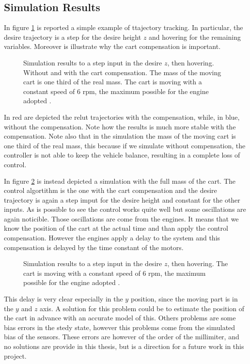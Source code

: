 \subsection{Simulation Results}

In figure \ref{fig:simulation1} is reported a simple example of ttajectory tracking. In particular, the desire trajectory is a step for the desire height $z$ and hovering for the remaining variables. Moreover is illustrate why the cart compensation is important. 

\begin{figure}[h]
	\centering
 	
 	\caption{Simulation results to a step input in the desire $z$, then hovering. Without and with the cart compensation. The mass of the moving cart is one third of the real mass. The cart is moving with a constant speed of $6$ rpm, the maximum possible for the engine adopted \cite{Carlos}.}
 	\label{fig:simulation1}		
\end{figure}

\noindent In red are depicted the relut trajectories with the compensation, while, in blue, without the compensation. Note how the results is much more stable with the compensation. Note also that in the simulation the mass of the moving cart is one third of the real mass, this because if we simulate without compensation, the controller is not able to keep the vehicle balance, resulting in a complete loss of control. 

\noindent In figure \ref{fig:simulation2} is instead depicted a simulation with the full mass of the cart. The control algortithm is the one with the cart compensation and the desire trajectory is again a step imput for the desire height and constant for the other inputs. As is possible to see the control works quite well but some oscillations are again noticible. Those oscillations are come from the engines. It means that we know the position of the cart at the actual time and than apply the control compensation. However the engines apply a delay to the system and this compensation is delayed by the time constant of the motors. 

\begin{figure}[h]
	\centering
 	
 	\caption{Simulation results to a step input in the desire $z$, then hovering. The cart is moving with a constant speed of $6$ rpm, the maximum possible for the engine adopted \cite{Carlos}.}
 	\label{fig:simulation2}		
\end{figure}

\noindent This delay is very clear especially in the $y$ position, since the moving part is in the $y$ and $z$ axis. A solution for this problem could be to estimate the position of the cart in advance with an accurate model of this. Others problems are some bias errors in the stedy state, however this problems come from the simulated bias of the sensors. These errors are however of the order of the millimiter, and no solutions are provide in this thesis, but is a direction for a future work in this project.